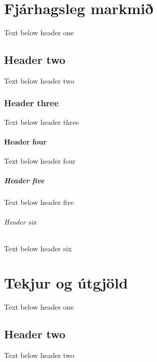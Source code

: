\documentclass[a4paper,10pt,icelandic]{sphinxmanual}
\begin{document}
\chapter{Fjárhagsleg markmið}
\label{\detokenize{fjarhagsleg-markmid/index:fjarhagsleg-markmi}}\label{\detokenize{fjarhagsleg-markmid/index::doc}}
\sphinxAtStartPar
Text below header one


\section{Header two}
\label{\detokenize{fjarhagsleg-markmid/index:header-two}}
\sphinxAtStartPar
Text below header two


\subsection{Header three}
\label{\detokenize{fjarhagsleg-markmid/index:header-three}}
\sphinxAtStartPar
Text below header three


\subsubsection{Header four}
\label{\detokenize{fjarhagsleg-markmid/index:header-four}}
\sphinxAtStartPar
Text below header four


\paragraph{Header five}
\label{\detokenize{fjarhagsleg-markmid/index:header-five}}
\sphinxAtStartPar
Text below header five


\subparagraph{Header six}
\label{\detokenize{fjarhagsleg-markmid/index:header-six}}
\sphinxAtStartPar
Text below header six

\sphinxstepscope


\chapter{Tekjur og útgjöld}
\label{\detokenize{tekjur-og-utgjold/index:tekjur-og-utgjold}}\label{\detokenize{tekjur-og-utgjold/index::doc}}
\sphinxAtStartPar
Text below header one


\section{Header two}
\label{\detokenize{tekjur-og-utgjold/index:header-two}}
\sphinxAtStartPar
Text below header two
\end{document}
